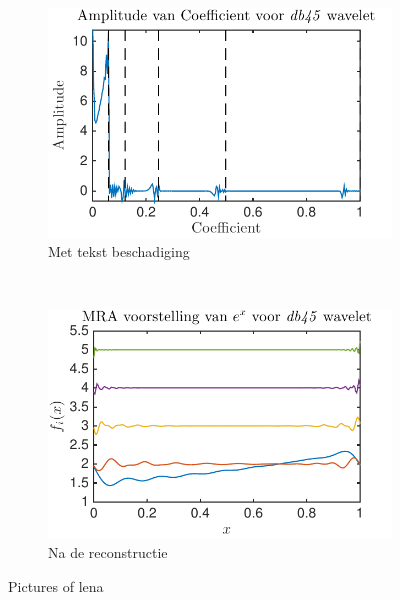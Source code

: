 \begin{figure}
\begin{subfigure}[b]{0.45\textwidth}
        \includegraphics[width=\textwidth]{../src/denoising/db45_noNoise/coef_exp_db45_4}
        \caption{Met tekst beschadiging}
        \label{fig:tiger}
    \end{subfigure}
    ~ %
    \begin{subfigure}[b]{0.45\textwidth}
        \includegraphics[width=\textwidth]{../src/denoising/db45_noNoise/MRA_exp_db45_4}
        \caption{Na de reconstructie}
        \label{fig:mouse}
    \end{subfigure}
    \caption{Pictures of lena}\label{fig:exp_noNoise}
\end{figure}


